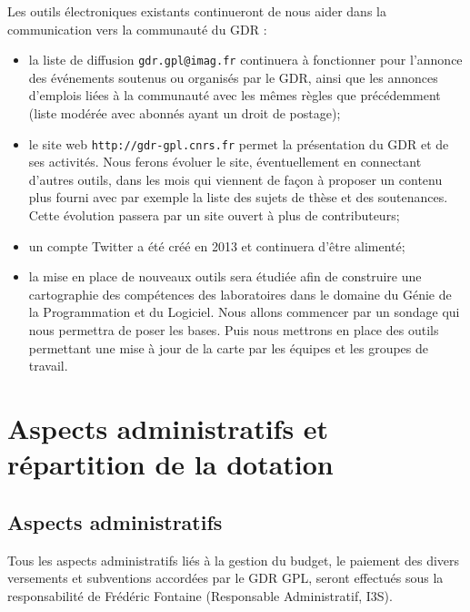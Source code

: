 \documentclass[11pt]{article}
\newcommand{\mynote}[3][black]{\textcolor{#1}{\fbox{\bfseries\sffamily\scriptsize{#2}}
{\small$\blacktriangleright$\textsf{\emph{#3}}$\blacktriangleleft$}}}
\newcommand{\TODO}[1]{\mynote[red]{TODO}{#1}}
\begin{document}
Les outils électroniques existants continueront de nous aider dans la communication vers la communauté du GDR :

\begin{itemize}
\item la liste de diffusion \texttt{gdr.gpl@imag.fr}  continuera à fonctionner
  pour l'annonce des événements soutenus ou organisés par le GDR, ainsi que les
  annonces d'emplois liées à la communauté avec les mêmes règles que
  précédemment (liste modérée avec abonnés ayant un droit de postage);

\item le site web  \texttt{http://gdr-gpl.cnrs.fr}  permet la présentation du
  GDR et de ses activités. Nous ferons évoluer le site, éventuellement en connectant d'autres outils, dans les mois qui
  viennent de façon à proposer un contenu plus fourni avec par exemple la liste des sujets de thèse et des soutenances.
  Cette évolution passera par un site ouvert à plus de contributeurs;
 
\item un compte Twitter a été créé en 2013 et continuera d'être alimenté;

\item la mise en place de nouveaux outils sera étudiée afin de construire une cartographie des compétences des laboratoires dans le domaine du Génie de la Programmation et du Logiciel. Nous allons commencer par un sondage qui nous permettra de poser les bases. Puis nous mettrons en place des outils permettant une mise à jour de la carte par les équipes et les groupes de travail.
\end{itemize}




\section{Aspects administratifs et répartition de la dotation}\label{budget}

\subsection{Aspects administratifs}
Tous les aspects administratifs liés à la gestion du budget, le paiement des divers versements et
subventions accordées par le GDR GPL, seront effectués sous la responsabilité
de Frédéric Fontaine (Responsable Administratif, I3S).
\end{document}
